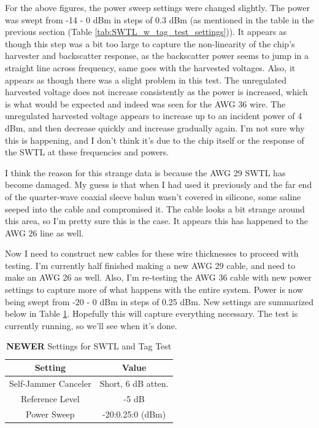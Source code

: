 \documentclass[12pt,onecolumn,titlepage]{article}
\begin{document}
For the above figures, the power sweep settings were changed slightly. The power was swept from -14 - 0 dBm in steps of 0.3 dBm (as mentioned in the table in the previous section (Table \ref{tab:SWTL_w_tag_test_settings})). It appears as though this step was a bit too large to capture the non-linearity of the chip's harvester and backscatter response, as the backscatter power seems to jump in a straight line across frequency, same goes with the harvested voltages. Also, it appears as though there was a slight problem in this test. The unregulated harvested voltage does not increase consistently as the power is increased, which is what would be expected and indeed was seen for the AWG 36 wire. The unregulated harvested voltage appears to increase up to an incident power of 4 dBm, and then decrease quickly and increase gradually again. I'm not sure why this is happening, and I don't think it's due to the chip itself or the response of the SWTL at these frequencies and powers.

I think the reason for this strange data is because the AWG 29 SWTL has become damaged. My guess is that when I had used it previously and the far end of the quarter-wave coaxial sleeve balun wasn't covered in silicone, some saline seeped into the cable and compromised it. The cable looks a bit strange around this area, so I'm pretty sure this is the case. It appears this has happened to the AWG 26 line as well. 

Now I need to construct new cables for these wire thicknesses to proceed with testing. I'm currently half finished making a new AWG 29 cable, and need to make an AWG 26 as well. Also, I'm re-testing the AWG 36 cable with new power settings to capture more of what happens with the entire system. Power is now being swept from -20 - 0 dBm in steps of 0.25 dBm. New settings are summarized below in Table \ref{tab:SWTL_w_tag_test_settings_r2}. Hopefully this will capture everything necessary. The test is currently running, so we'll see when it's done. 



\begin{table}[h!]
\centering
	\caption{ {\bf NEWER} Settings for SWTL and Tag Test}
	\begin{tabular}{| c | c |}
	\hline
	{\bf Setting} & {\bf Value} \\ \hline
	Self-Jammer Canceler & Short, 6 dB atten.  \\ \hline
	Reference Level & -5 dB  \\ \hline
	Power Sweep & -20:0.25:0 (dBm)  \\ \hline
	\end{tabular}
\label{tab:SWTL_w_tag_test_settings_r2}
\end{table}
\end{document}
